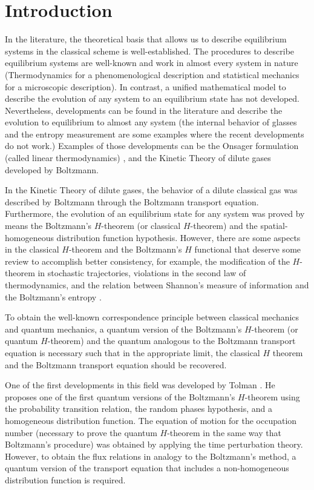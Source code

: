 \section{Introduction}

In the literature, the theoretical basis that allows us to describe equilibrium
systems in the classical scheme is well-established.
The procedures to describe
equilibrium systems are well-known and work in almost every system in nature
(Thermodynamics for a phenomenological description and statistical mechanics
for a microscopic description). In contrast, a unified mathematical model to
describe the evolution of any system to an equilibrium state has not developed.
Nevertheless, developments can be found in the literature and describe the
evolution to equilibrium to almost any system (the internal behavior of glasses
\cite{bib:zanotto2018} and the entropy measurement
\cite{bib:schmelzer2018,bib:nemilov2018} are some examples where the recent
developments do not work.) Examples of those developments can be the Onsager
formulation (called linear thermodynamics)
\cite{bib:keizer1987,bib:onsager1931}, and the Kinetic Theory of dilute gases
developed by Boltzmann.

In the Kinetic Theory of dilute gases, the behavior of a dilute classical gas
was described by Boltzmann through the Boltzmann transport equation.
Furthermore, the evolution of an equilibrium state for any system was proved by
means the Boltzmann's $H$-theorem (or classical $H$-theorem) and the
spatial-homogeneous distribution function hypothesis.
However, there are some aspects in the classical $H$-theorem and the
Boltzmann's $H$ functional that deserve some review to accomplish better
consistency, for example, the modification of the $H$-theorem in stochastic
trajectories, violations in the second law of thermodynamics, and the relation
between Shannon's measure of information and the Boltzmann's entropy %
\cite{bib:nemilov2018,bib:keizer1987,bib:onsager1931,bib:brown2008,bib:dragoljub2009}.

To obtain the well-known correspondence principle between classical mechanics
and quantum mechanics, a quantum version of the Boltzmann's $H$-theorem (or
quantum $H$-theorem) and the quantum analogous to the Boltzmann transport
equation is necessary such that in the appropriate limit, the  classical $H$
theorem and the Boltzmann transport equation should be recovered.

One of the first developments in this field was developed by Tolman
\cite{bib:tolman}. He proposes one of the first quantum versions of the
Boltzmann's $H$-theorem using the probability transition relation, the random
phases hypothesis, and a homogeneous distribution function. The equation of
motion for the occupation number (necessary to prove the quantum $H$-theorem in
the same way that Boltzmann's procedure) was obtained by applying the time
perturbation theory. However, to obtain the flux relations in analogy to the
Boltzmann's method, a quantum version of the transport equation that includes a
non-homogeneous distribution function is required.

